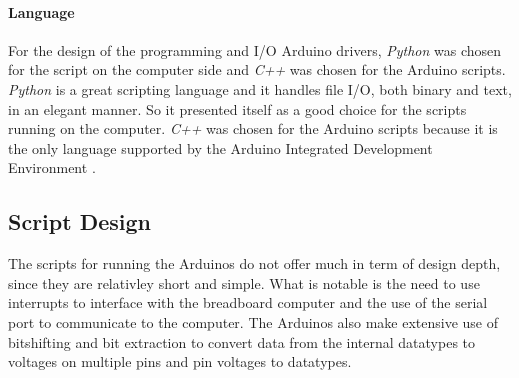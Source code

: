 \paragraph{Language} For the design of the programming and I/O Arduino drivers, \emph{Python} was chosen for the
script on the computer side and \emph{C++} was chosen for the Arduino scripts. \emph{Python} is a great scripting
language and it handles file I/O, both binary and text, in an elegant manner. So it presented itself as a good
choice for the scripts running on the computer. \emph{C++} was chosen for the Arduino scripts because it is the only
language supported by the Arduino Integrated Development Environment \cite{arduino_ide}.

\subsection{Script Design}
The scripts for running the Arduinos do not offer much in term of design depth, since they are relativley short
and simple. What is notable is the need to use interrupts to interface with the breadboard computer and the use of
the serial port to communicate to the computer. The Arduinos also make extensive use of bitshifting and bit
extraction to convert data from the internal datatypes to voltages on multiple pins and pin voltages to datatypes.
